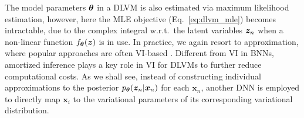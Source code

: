 %
The model parameters $\bm{\theta}$ in a DLVM is also estimated via maximum likelihood estimation, however, here the MLE objective (Eq.~\eqref{eq:dlvm_mle}) becomes intractable, due to the complex integral w.r.t.~the latent variables $\bm{z}_n$ when a non-linear function $f_{\bm{\theta}}(\bm{z})$ is in use. In practice, we again resort to approximation, where popular approaches are often VI-based \citep{welling2014auto,rezende:vae2014}. Different from VI in BNNs, amortized inference \citep{gershman2014amortized} plays a key role in VI for DLVMs to further reduce computational costs. As we shall see, instead of constructing individual approximations to the posterior $p_{\bm{\theta}}(\bm{z}_n|\bm{x}_n)$ for each $\bm{x}_n$, another 
DNN is employed to directly map $\bm{x}_i$ to the variational parameters of its corresponding variational distribution.

